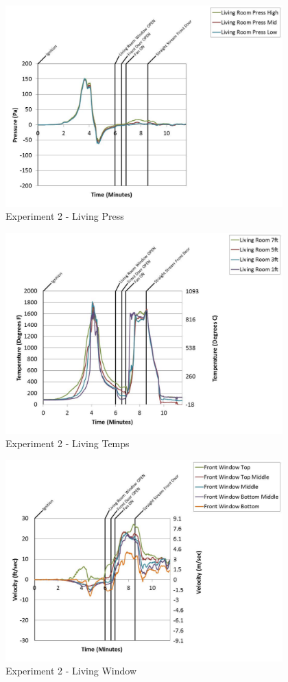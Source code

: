\documentclass{article}
\begin{document}
\begin{appendices}
	\begin{figure}[h!]
		\centering
		\includegraphics[height=3.05in]{0_Images/Results_Charts/Exp_2_Charts/LivingPress.pdf}
		\caption{Experiment 2 - Living Press}
	\end{figure}
 
	\clearpage

	\begin{figure}[h!]
		\centering
		\includegraphics[height=3.05in]{0_Images/Results_Charts/Exp_2_Charts/LivingTemps.pdf}
		\caption{Experiment 2 - Living Temps}
	\end{figure}
 

	\begin{figure}[h!]
		\centering
		\includegraphics[height=3.05in]{0_Images/Results_Charts/Exp_2_Charts/LivingWindow.pdf}
		\caption{Experiment 2 - Living Window}
	\end{figure}
 

\end{appendices}
\end{document}
